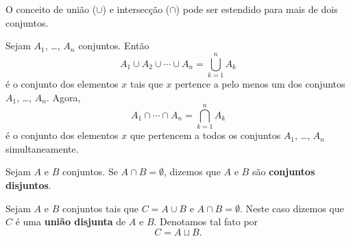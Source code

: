 O conceito de uni{\~a}o ($ \cup $) e intersec{\c c}{\~a}o ($ \cap $) pode ser estendido para mais de dois conjuntos.

\begin{definicao}
Sejam $A_{1}$, \dots, $A_{n}$ conjuntos. Ent{\~a}o
\[
A_{1} \cup A_{2} \cup \cdots \cup A_{n}= \displaystyle\bigcup_{k=1}^n A_{k}
\]
{\'e} o conjunto dos elementos $x$ tais que $x$ pertence a pelo menos um dos conjuntos $A_{1}$, \dots, $A_{n}$. Agora,
\[
A_{1} \cap \cdots \cap A_{n} = \displaystyle\bigcap_{k=1}^{n}A_{k}
\]
{\'e} o conjunto dos elementos $x$ que pertencem a todos os conjuntos $A_{1}$, \dots, $A_{n}$ simultaneamente.
\end{definicao}

\begin{definicao}
	Sejam $A$ e $B$ conjuntos. Se $A \cap B = \emptyset$, dizemos que $A$ e $B$ s{\~a}o \textbf{conjuntos disjuntos}.	
\end{definicao}


Sejam $A$ e $B$ conjuntos tais que $C = A \cup B$ e $A \cap B = \emptyset$. Neste caso dizemos que $C$ {\'e} uma \textbf{uni{\~a}o disjunta} de $A$ e $B$. Denotamos tal fato por
\[
C = A \sqcup B.
\]

